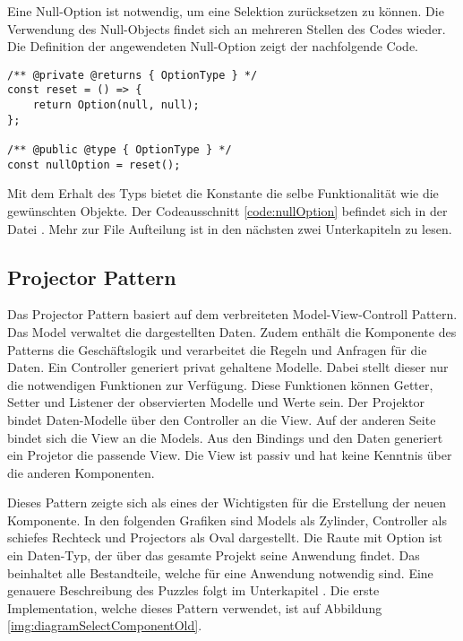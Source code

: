 Eine Null-Option ist notwendig, um eine Selektion zurücksetzen zu können. 
Die Verwendung des Null-Objects findet sich an mehreren Stellen des Codes wieder. 
Die Definition der angewendeten Null-Option zeigt der nachfolgende Code. 

\begin{lstlisting}[style = htmlcssjs, caption = Null-Option Definition, label = code:nullOption]
/** @private @returns { OptionType } */
const reset = () => {
    return Option(null, null);
};

/** @public @type { OptionType } */
const nullOption = reset();
\end{lstlisting}

Mit dem Erhalt des Typs  bietet die Konstante die selbe Funktionalität wie die gewünschten Objekte. 
Der Codeausschnitt \ref{code:nullOption} befindet sich in der Datei . 
Mehr zur File Aufteilung ist in den nächsten zwei Unterkapiteln zu lesen. 


\subsection{Projector Pattern}
\label{sec:projectorPattern}

Das Projector Pattern basiert auf dem verbreiteten Model-View-Controll Pattern. 
Das Model verwaltet die dargestellten Daten. 
Zudem enthält die Komponente des Patterns die Geschäftslogik und verarbeitet die Regeln und Anfragen für die Daten. 
Ein Controller generiert privat gehaltene Modelle. 
Dabei stellt dieser nur die notwendigen Funktionen zur Verfügung. 
Diese Funktionen können Getter, Setter und Listener der observierten Modelle und Werte sein. 
Der Projektor bindet Daten-Modelle über den Controller an die View. 
Auf der anderen Seite bindet sich die View an die Models. 
Aus den Bindings und den Daten generiert ein Projetor die passende View. 
Die View ist passiv und hat keine Kenntnis über die anderen Komponenten. 

Dieses Pattern zeigte sich als eines der Wichtigsten für die Erstellung der neuen Komponente. 
In den folgenden Grafiken sind Models als Zylinder, Controller als schiefes Rechteck und Projectors als Oval dargestellt. 
Die Raute mit Option ist ein Daten-Typ, der über das gesamte Projekt seine Anwendung findet. 
Das  beinhaltet alle Bestandteile, welche für eine Anwendung notwendig sind. 
Eine genauere Beschreibung des Puzzles folgt im Unterkapitel \textbf{}. 
Die erste Implementation, welche dieses Pattern verwendet, ist auf Abbildung \ref{img:diagramSelectComponentOld}. 

